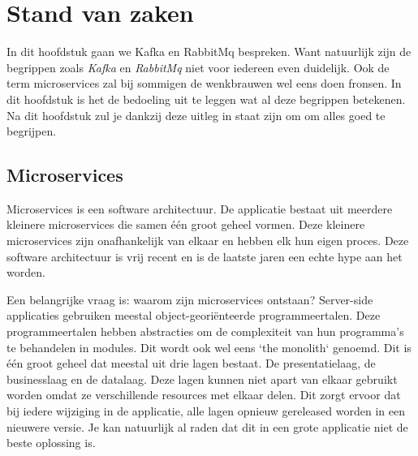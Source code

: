 \chapter{Stand van zaken}
\label{ch:stand-van-zaken}

In dit hoofdstuk gaan we Kafka en RabbitMq bespreken. Want natuurlijk zijn de begrippen zoals \emph{Kafka} en \emph{RabbitMq} niet voor iedereen even duidelijk. Ook de term microservices zal bij sommigen de wenkbrauwen wel eens doen fronsen. In dit hoofdstuk is het de bedoeling uit te leggen wat al deze begrippen betekenen. Na dit hoofdstuk zul je dankzij deze uitleg in staat zijn om om alles goed te begrijpen.
\section{Microservices}

Microservices is een software architectuur. De applicatie bestaat uit meerdere kleinere microservices die samen één groot geheel vormen. Deze kleinere microservices zijn onafhankelijk van elkaar en hebben elk hun eigen proces. Deze software architectuur is vrij recent en is de laatste jaren een echte hype aan het worden.

Een belangrijke vraag is: waarom zijn microservices ontstaan? Server-side applicaties gebruiken meestal object-georiënteerde programmeertalen. Deze programmeertalen hebben abstracties om de complexiteit van hun programma's te behandelen in modules. Dit wordt ook wel eens `the monolith` genoemd. Dit is één groot geheel dat meestal uit drie lagen bestaat. De presentatielaag, de businesslaag en de datalaag. Deze lagen kunnen niet apart van elkaar gebruikt worden omdat ze verschillende resources met elkaar delen. Dit zorgt ervoor dat bij iedere wijziging in de applicatie, alle lagen opnieuw gereleased worden in een nieuwere versie. Je kan natuurlijk al raden dat dit in een grote applicatie niet de beste oplossing is. 

